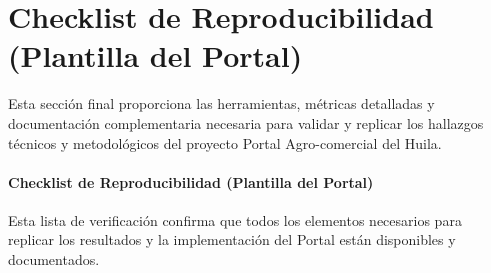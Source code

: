 \appendix

\section{Checklist de Reproducibilidad (Plantilla del Portal)}

Esta sección final proporciona las herramientas, métricas detalladas y documentación complementaria necesaria para validar y replicar los hallazgos técnicos y metodológicos del proyecto Portal Agro-comercial del Huila.

\paragraph{Checklist de Reproducibilidad (Plantilla del Portal)}

Esta lista de verificación confirma que todos los elementos necesarios para replicar los resultados y la implementación del Portal están disponibles y documentados.

